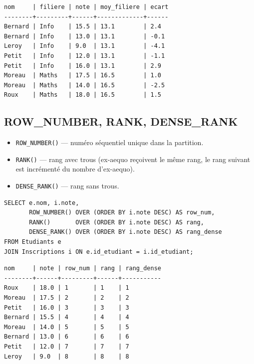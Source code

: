 \begin{codeoutput}
\begin{verbatim}
nom     | filiere | note | moy_filiere | ecart
--------+---------+------+-------------+------
Bernard | Info    | 15.5 | 13.1        | 2.4
Bernard | Info    | 13.0 | 13.1        | -0.1
Leroy   | Info    | 9.0  | 13.1        | -4.1
Petit   | Info    | 12.0 | 13.1        | -1.1
Petit   | Info    | 16.0 | 13.1        | 2.9
Moreau  | Maths   | 17.5 | 16.5        | 1.0
Moreau  | Maths   | 14.0 | 16.5        | -2.5
Roux    | Maths   | 18.0 | 16.5        | 1.5
\end{verbatim}
\end{codeoutput}

\subsection{ROW\_NUMBER, RANK, DENSE\_RANK}

\begin{definition}
\begin{itemize}
    \item \texttt{ROW\_NUMBER()} --- num\'ero s\'equentiel unique dans la partition.
    \item \texttt{RANK()} --- rang avec trous (ex-aequo re\c{c}oivent le m\^eme rang,
          le rang suivant est incr\'ement\'e du nombre d'ex-aequo).
    \item \texttt{DENSE\_RANK()} --- rang sans trous.
\end{itemize}
\end{definition}

\begin{codeblock}[title=\textbf{Classement des \'etudiants par note}]
\begin{verbatim}
SELECT e.nom, i.note,
       ROW_NUMBER() OVER (ORDER BY i.note DESC) AS row_num,
       RANK()       OVER (ORDER BY i.note DESC) AS rang,
       DENSE_RANK() OVER (ORDER BY i.note DESC) AS rang_dense
FROM Etudiants e
JOIN Inscriptions i ON e.id_etudiant = i.id_etudiant;
\end{verbatim}
\end{codeblock}

\begin{codeoutput}
\begin{verbatim}
nom     | note | row_num | rang | rang_dense
--------+------+---------+------+-----------
Roux    | 18.0 | 1       | 1    | 1
Moreau  | 17.5 | 2       | 2    | 2
Petit   | 16.0 | 3       | 3    | 3
Bernard | 15.5 | 4       | 4    | 4
Moreau  | 14.0 | 5       | 5    | 5
Bernard | 13.0 | 6       | 6    | 6
Petit   | 12.0 | 7       | 7    | 7
Leroy   | 9.0  | 8       | 8    | 8
\end{verbatim}
\end{codeoutput}

